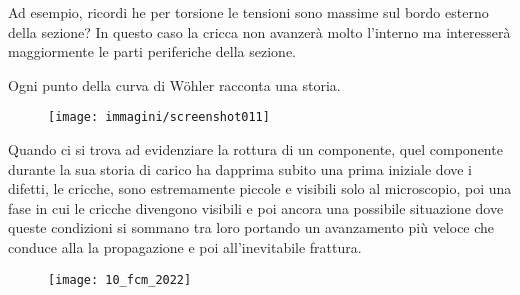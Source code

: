 \documentclass{article}
\begin{document}
		\begin{adjustwidth}{2in}{}
		
		Ad esempio, ricordi he per torsione le tensioni sono massime sul bordo esterno della sezione? In questo caso la cricca non avanzerà molto l'interno ma interesserà maggiormente le parti periferiche della sezione. \newline
		
		Ogni punto della curva di Wöhler racconta una storia. 
		\begin{figure}[H]
			\centering
			\texttt{[image: immagini/screenshot011]}
			\label{fig:screenshot011}
		\end{figure}
		
		Quando ci si trova ad evidenziare la rottura di un componente, quel componente durante la sua storia di carico ha dapprima subito una prima iniziale dove i difetti, le cricche, sono estremamente piccole e visibili solo al microscopio, poi una fase in cui le cricche divengono visibili e poi ancora una possibile situazione dove queste condizioni si sommano tra loro portando un avanzamento più veloce che conduce alla la propagazione e poi all'inevitabile frattura.
		
	\end{adjustwidth}
	\begin{figure}[H]
	\texttt{[image: 10\_fcm\_2022]}
	\end{figure}
\end{document}

